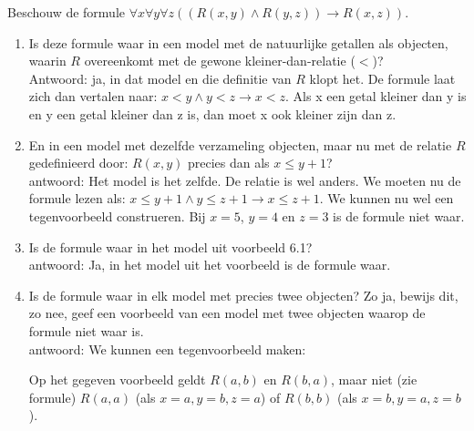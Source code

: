  \begin{answer} %
 Beschouw de formule $\forall x\forall y\forall z((R(x,y)\wedge R(y,z))\rightarrow R(x,z))$.
 \begin{enumerate}
     \item Is deze formule waar in een model met de natuurlijke getallen als objecten, waarin $R$ overeenkomt met de gewone kleiner-dan-relatie ($<$)? \\
     Antwoord: ja, in dat model en die definitie van $R$ klopt het. De formule laat zich dan vertalen naar: $x < y \wedge y < z \rightarrow x < z$. Als x een getal kleiner dan y is en y een getal kleiner dan z is, dan moet x ook kleiner zijn dan z.
     \item En in een model met dezelfde verzameling objecten, maar nu met de relatie $R$ gedefinieerd door: $R(x, y)$ precies dan als $x\leq y+1$? \\
     antwoord: Het model is het zelfde. De relatie is wel anders. We moeten nu de formule lezen als:  $x \leq y+1 \wedge y \leq z+1 \rightarrow x \leq z+1$. We kunnen nu wel een tegenvoorbeeld construeren. Bij $x = 5$, $y = 4$ en $z = 3$ is de formule niet waar. 
     \item Is de formule waar in het model uit voorbeeld 6.1?\\
     antwoord: Ja, in het model uit het voorbeeld is de formule waar.
     \item Is de formule waar in elk model met precies twee objecten? Zo ja, bewijs dit, zo nee, geef een voorbeeld van een model met twee objecten waarop de formule niet waar is. \\
     antwoord: We kunnen een tegenvoorbeeld maken: \\
     \begin{center}
        \end{center}
    Op het gegeven voorbeeld geldt $R(a,b)$ en $R(b,a)$, maar niet (zie formule) $R(a,a)$ (als $x=a, y=b, z=a$) of $R(b,b)$ (als $x=b, y=a, z=b$).
 \end{enumerate}
 \end{answer}
 
